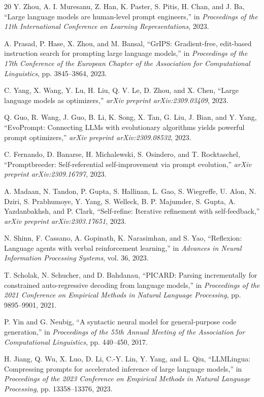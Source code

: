 \documentclass[10pt,twocolumn]{article}
\begin{document}
\begin{thebibliography}{20}
Y. Zhou, A. I. Muresanu, Z. Han, K. Paster, S. Pitis, H. Chan, and J. Ba,
``Large language models are human-level prompt engineers,''
in \emph{Proceedings of the 11th International Conference on Learning Representations}, 2023.

A. Prasad, P. Hase, X. Zhou, and M. Bansal,
``GrIPS: Gradient-free, edit-based instruction search for prompting large language models,''
in \emph{Proceedings of the 17th Conference of the European Chapter of the Association for Computational Linguistics}, pp. 3845--3864, 2023.

C. Yang, X. Wang, Y. Lu, H. Liu, Q. V. Le, D. Zhou, and X. Chen,
``Large language models as optimizers,''
\emph{arXiv preprint arXiv:2309.03409}, 2023.

Q. Guo, R. Wang, J. Guo, B. Li, K. Song, X. Tan, G. Liu, J. Bian, and Y. Yang,
``EvoPrompt: Connecting LLMs with evolutionary algorithms yields powerful prompt optimizers,''
\emph{arXiv preprint arXiv:2309.08532}, 2023.

C. Fernando, D. Banarse, H. Michalewski, S. Osindero, and T. Rocktaschel,
``Promptbreeder: Self-referential self-improvement via prompt evolution,''
\emph{arXiv preprint arXiv:2309.16797}, 2023.

A. Madaan, N. Tandon, P. Gupta, S. Hallinan, L. Gao, S. Wiegreffe, U. Alon, N. Dziri, S. Prabhumoye, Y. Yang, S. Welleck, B. P. Majumder, S. Gupta, A. Yazdanbakhsh, and P. Clark,
``Self-refine: Iterative refinement with self-feedback,''
\emph{arXiv preprint arXiv:2303.17651}, 2023.

N. Shinn, F. Cassano, A. Gopinath, K. Narasimhan, and S. Yao,
``Reflexion: Language agents with verbal reinforcement learning,''
in \emph{Advances in Neural Information Processing Systems}, vol. 36, 2023.

T. Scholak, N. Schucher, and D. Bahdanau,
``PICARD: Parsing incrementally for constrained auto-regressive decoding from language models,''
in \emph{Proceedings of the 2021 Conference on Empirical Methods in Natural Language Processing}, pp. 9895--9901, 2021.

P. Yin and G. Neubig,
``A syntactic neural model for general-purpose code generation,''
in \emph{Proceedings of the 55th Annual Meeting of the Association for Computational Linguistics}, pp. 440--450, 2017.

H. Jiang, Q. Wu, X. Luo, D. Li, C.-Y. Lin, Y. Yang, and L. Qiu,
``LLMLingua: Compressing prompts for accelerated inference of large language models,''
in \emph{Proceedings of the 2023 Conference on Empirical Methods in Natural Language Processing}, pp. 13358--13376, 2023.


\end{thebibliography}
\end{document}
